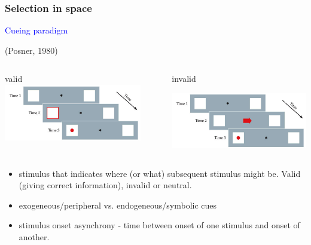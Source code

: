 \documentclass[]{beamer}
\begin{document}
\begin{frame}
 \frametitle{Selection in space}
\begin{overlayarea}{110mm}{75mm}

\begin{center}
\textcolor{blue}{Cueing paradigm} \begin{scriptsize}(Posner, 1980) \end{scriptsize}
\end{center}
\begin{columns}[T]
 \begin{column}{50mm}
\centering valid
\includegraphics[width=60mm]{figs/l8/cueing_valid.png}
 \end{column}

 \begin{column}{80mm}
\centering invalid
 
\includegraphics[width=60mm]{figs/l8/cueing_invalid.png}
 \end{column}
\end{columns}

\vspace{5mm}
\begin{itemize}
 \item<2->[Cue] stimulus that indicates where (or what) subsequent stimulus might be. Valid (giving correct information), invalid or neutral.
 \item<3-> exogeneous/peripheral vs. endogeneous/symbolic cues
 \item<4->[SOA] stimulus onset asynchrony  - time between onset of one stimulus and onset of another.
\end{itemize}
\end{overlayarea}
\end{frame}
\end{document}
